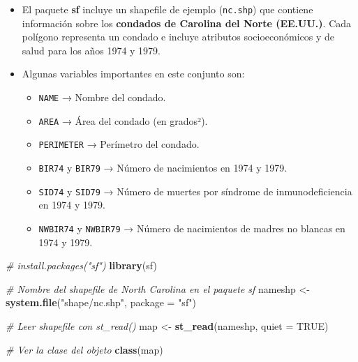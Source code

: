 \documentclass[
]{book}
\newenvironment{Shaded}{\begin{snugshade}}{\end{snugshade}}
\newcommand{\AttributeTok}[1]{\textcolor[rgb]{0.13,0.29,0.53}{#1}}
\newcommand{\CommentTok}[1]{\textcolor[rgb]{0.56,0.35,0.01}{\textit{#1}}}
\newcommand{\ConstantTok}[1]{\textcolor[rgb]{0.56,0.35,0.01}{#1}}
\newcommand{\FunctionTok}[1]{\textcolor[rgb]{0.13,0.29,0.53}{\textbf{#1}}}
\newcommand{\NormalTok}[1]{#1}
\newcommand{\OtherTok}[1]{\textcolor[rgb]{0.56,0.35,0.01}{#1}}
\newcommand{\StringTok}[1]{\textcolor[rgb]{0.31,0.60,0.02}{#1}}
\providecommand{\tightlist}{%
  \setlength{\itemsep}{0pt}\setlength{\parskip}{0pt}}
\begin{document}
\begin{itemize}
\item
  El paquete \textbf{sf} incluye un shapefile de ejemplo (\texttt{nc.shp}) que contiene información sobre los \textbf{condados de Carolina del Norte (EE.UU.)}. Cada polígono representa un condado e incluye atributos socioeconómicos y de salud para los años 1974 y 1979.
\item
  Algunas variables importantes en este conjunto son:

  \begin{itemize}
  \tightlist
  \item
    \texttt{NAME} → Nombre del condado.\\
  \item
    \texttt{AREA} → Área del condado (en grados²).\\
  \item
    \texttt{PERIMETER} → Perímetro del condado.\\
  \item
    \texttt{BIR74} y \texttt{BIR79} → Número de nacimientos en 1974 y 1979.\\
  \item
    \texttt{SID74} y \texttt{SID79} → Número de muertes por síndrome de inmunodeficiencia en 1974 y 1979.\\
  \item
    \texttt{NWBIR74} y \texttt{NWBIR79} → Número de nacimientos de madres no blancas en 1974 y 1979.
  \end{itemize}
\end{itemize}

\begin{Shaded}
\begin{Highlighting}[]
\CommentTok{\# install.packages("sf")}
\FunctionTok{library}\NormalTok{(sf)}

\CommentTok{\# Nombre del shapefile de North Carolina en el paquete sf}
\NormalTok{nameshp }\OtherTok{\textless{}{-}} \FunctionTok{system.file}\NormalTok{(}\StringTok{"shape/nc.shp"}\NormalTok{, }\AttributeTok{package =} \StringTok{"sf"}\NormalTok{)}

\CommentTok{\# Leer shapefile con st\_read()}
\NormalTok{map }\OtherTok{\textless{}{-}} \FunctionTok{st\_read}\NormalTok{(nameshp, }\AttributeTok{quiet =} \ConstantTok{TRUE}\NormalTok{)}

\CommentTok{\# Ver la clase del objeto}
\FunctionTok{class}\NormalTok{(map)}
\end{Highlighting}
\end{Shaded}
\end{document}
